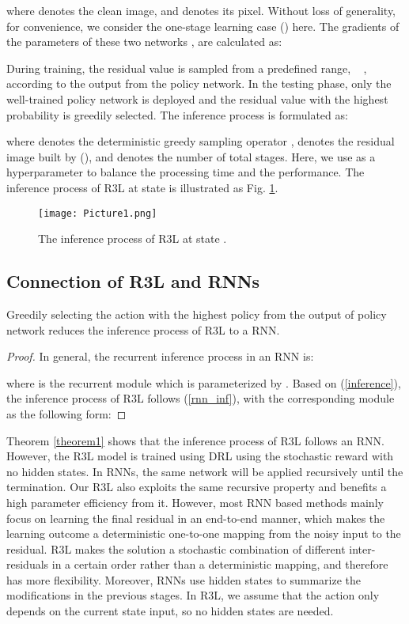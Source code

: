 \documentclass{article}
\begin{document}
where  denotes the clean image, and  denotes its  pixel.
Without loss of generality, for convenience, we consider the one-stage learning case () here. The gradients of the parameters of these two networks , are calculated as:

During training, the residual value  is sampled from a predefined range, \ie~ , according to the output from the policy network. In the testing phase, only the well-trained policy network is deployed and the residual value with the highest probability is greedily selected. The inference process is formulated as:

where  denotes the deterministic greedy sampling operator \cite{kool2018attention,zhang2020deep},  denotes the residual image built by  (), and  denotes the number of total stages. Here, we use  as a hyperparameter to balance the processing time and the performance. The inference process of R3L at state  is illustrated as Fig. \ref{fig:inference}.
\begin{figure}[t]
\centering
\texttt{[image: Picture1.png]}
\caption{The inference process of R3L at state .}
\label{fig:inference}
\end{figure}
\subsection{Connection of R3L and RNNs}
\begin{theorem}\label{theorem1}
Greedily selecting the action with the highest policy from the output of policy network reduces the inference process of R3L to a RNN.
\end{theorem}
\begin{proof}\renewcommand{\qedsymbol}{}
In general, the recurrent inference process in an RNN is:

where  is the recurrent module which is parameterized by .
Based on (\ref{inference}), the inference process of R3L follows (\ref{rnn_inf}), with the corresponding module  as the following form:

\end{proof}
Theorem \ref{theorem1} shows that the inference process of R3L follows an RNN. However, the R3L model is trained using DRL using the stochastic reward with no hidden states. In RNNs, the same network will be applied recursively until the termination. Our R3L also exploits the same recursive property and benefits a high parameter efficiency from it. However, most RNN based methods mainly focus on learning the final residual in an end-to-end manner, which makes the learning outcome a deterministic one-to-one mapping from the noisy input to the residual. R3L makes the solution a stochastic combination of different inter-residuals in a certain order rather than a deterministic mapping, and therefore has more flexibility. Moreover, RNNs use hidden states to summarize the modifications in the previous stages. In R3L, we assume that the action only depends on the current state input, so no hidden states are needed. 
\end{document}
